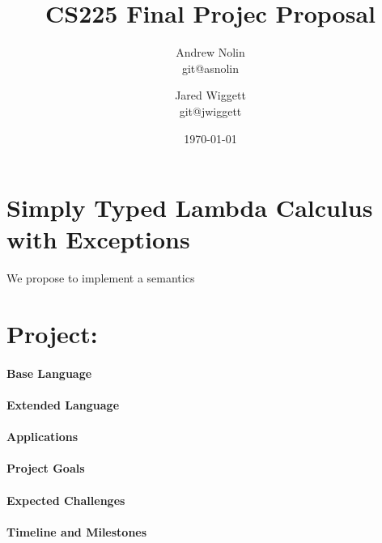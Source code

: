 \documentclass{article}
\title{CS225 Final Projec Proposal}
\author{Andrew Nolin \\ git@asnolin \and Jared Wiggett \\ git@jwiggett}
\date{\today}
\begin{document}
\maketitle
\section*{Simply Typed Lambda Calculus with Exceptions}
We propose to implement a semantics 

\section*{Project: }

\paragraph{Base Language}

\paragraph{Extended Language}

\paragraph{Applications}

\paragraph{Project Goals}

\paragraph{Expected Challenges}

\paragraph{Timeline and Milestones}
\end{document}
